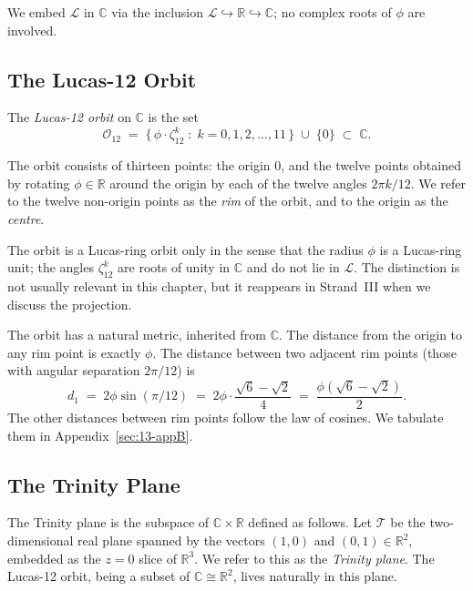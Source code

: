 We embed $\mathcal{L}$ in $\mathbb{C}$ via the inclusion
$\mathcal{L} \hookrightarrow \mathbb{R} \hookrightarrow \mathbb{C}$;
no complex roots of $\phi$ are involved.

\subsection{The Lucas-12 Orbit}
\label{fa_13:sec:13-lucas-12-orbit}

\begin{definition}
\label{def:13-lucas-12}
The \emph{Lucas-12 orbit} on $\mathbb{C}$ is the set
\[
  \mathcal{O}_{12} \;=\; \bigl\{\, \phi \cdot \zeta_{12}^{k} \;:\;
    k = 0, 1, 2, \ldots, 11 \,\bigr\} \;\cup\; \{0\} \;\subset\;
    \mathbb{C}.
\]
\end{definition}

The orbit consists of thirteen points: the origin $0$, and the
twelve points obtained by rotating $\phi \in \mathbb{R}$ around the
origin by each of the twelve angles $2\pi k / 12$. We refer to the
twelve non-origin points as the \emph{rim} of the orbit, and to the
origin as the \emph{centre}.

\begin{remark}
The orbit is a Lucas-ring orbit only in the sense that the radius
$\phi$ is a Lucas-ring unit; the angles $\zeta_{12}^{k}$ are roots
of unity in $\mathbb{C}$ and do not lie in $\mathcal{L}$. The
distinction is not usually relevant in this chapter, but it
reappears in Strand~III when we discuss the projection.
\end{remark}

The orbit has a natural metric, inherited from $\mathbb{C}$. The
distance from the origin to any rim point is exactly $\phi$. The
distance between two adjacent rim points (those with angular
separation $2\pi / 12$) is
\[
  d_{1} \;=\; 2\phi \sin(\pi/12)
       \;=\; 2\phi \cdot \frac{\sqrt{6} - \sqrt{2}}{4}
       \;=\; \frac{\phi(\sqrt{6} - \sqrt{2})}{2}.
\]
The other distances between rim points follow the law of cosines.
We tabulate them in Appendix~\ref{sec:13-appB}.

\subsection{The Trinity Plane}
\label{fa_13:sec:13-trinity-plane}

The Trinity plane is the subspace of $\mathbb{C} \times \mathbb{R}$
defined as follows. Let $\mathcal{T}$ be the two-dimensional real
plane spanned by the vectors $(1, 0)$ and $(0, 1) \in \mathbb{R}^{2}$,
embedded as the $z = 0$ slice of $\mathbb{R}^{3}$. We refer to this
as the \emph{Trinity plane}. The Lucas-12 orbit, being a subset of
$\mathbb{C} \cong \mathbb{R}^{2}$, lives naturally in this plane.

